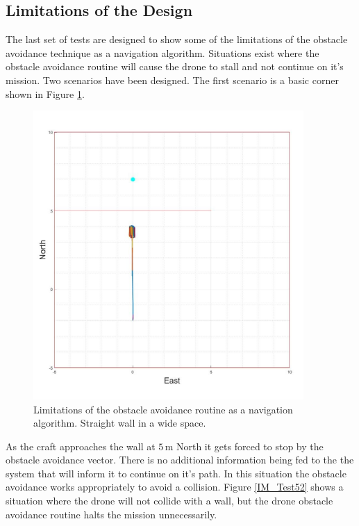 		\subsection{Limitations of the Design}
		The last set of tests are designed to show some of the limitations of the obstacle avoidance technique as a navigation algorithm. Situations exist where the obstacle avoidance routine will cause the drone to stall and not continue on it's mission. Two scenarios have been designed. The first scenario is a basic corner shown in Figure \ref{IM_Test51}.
		
		\begin{figure}[H]
			\centering
			\includegraphics[height = 11cm]{../References/Testing/Fail2.jpg} 
			\caption{Limitations of the obstacle avoidance routine as a navigation algorithm. Straight wall in a wide space.}
			\label{IM_Test51}
		\end{figure}
		
		As the craft approaches the wall at $5$\,m North it gets forced to stop by the obstacle avoidance vector. There is no additional information being fed to the the system that will inform it to continue on it's path. In this situation the obstacle avoidance works appropriately to avoid a collision. Figure \ref{IM_Test52} shows a situation where the drone will not collide with a wall, but the drone obstacle avoidance routine halts the mission unnecessarily.
		
